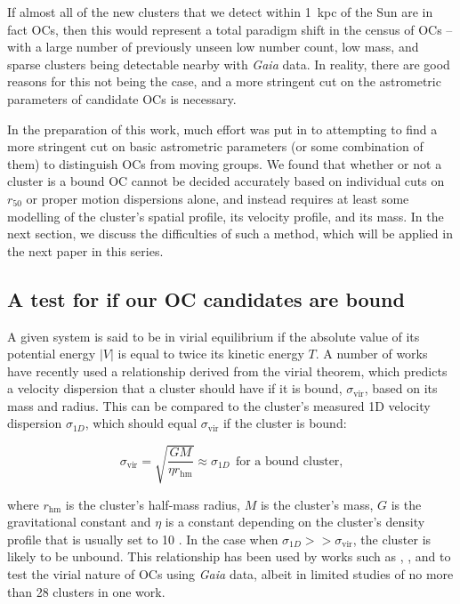 If almost all of the new clusters that we detect within 1~kpc of the Sun are in fact OCs, then this would represent a total paradigm shift in the census of OCs -- with a large number of previously unseen low number count, low mass, and sparse clusters being detectable nearby with \emph{Gaia} data. In reality, there are good reasons for this not being the case, and a more stringent cut on the astrometric parameters of candidate OCs is necessary.

In the preparation of this work, much effort was put in to attempting to find a more stringent cut on basic astrometric parameters (or some combination of them) to distinguish OCs from moving groups. We found that whether or not a cluster is a bound OC cannot be decided accurately based on individual cuts on $r_{50}$ or proper motion dispersions alone, and instead requires at least some modelling of the cluster's spatial profile, its velocity profile, and its mass. In the next section, we discuss the difficulties of such a method, which will be applied in the next paper in this series.

\subsection{A test for if our OC candidates are bound}

A given system is said to be in virial equilibrium if the absolute value of its potential energy $|V|$ is equal to twice its kinetic energy $T$. A number of works have recently used a relationship derived from the virial theorem, which predicts a velocity dispersion that a cluster should have if it is bound, $\sigma_\text{vir}$, based on its mass and radius. This can be compared to the cluster's measured 1D velocity dispersion $\sigma_{1D}$, which should equal $\sigma_\text{vir}$ if the cluster is bound:

\begin{equation}
    \sigma_\text{vir} = \sqrt{\frac{GM}{\eta r_\text{hm}}} \approx \sigma_{1D} \ \ \text{for a bound cluster,}
\end{equation}

\noindent
where $r_\text{hm}$ is the cluster's half-mass radius, $M$ is the cluster's mass, $G$ is the gravitational constant and $\eta$ is a constant depending on the cluster's density profile that is usually set to 10 \citep{portegies_zwart_young_2010}. In the case when $\sigma_{1D} >> \sigma_\text{vir}$, the cluster is likely to be unbound. This relationship has been used by works such as \cite{bravi_gaia-eso_2018}, \cite{kuhn_kinematics_2019}, and \cite{pang_3d_2021} to test the virial nature of OCs using \emph{Gaia} data, albeit in limited studies of no more than 28 clusters in one work.

